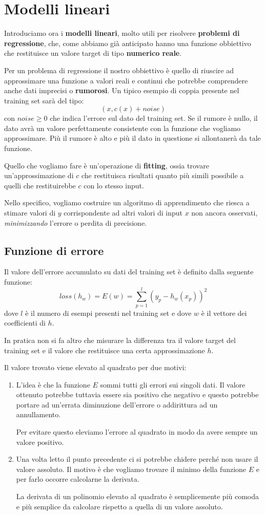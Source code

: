 \chapter{Modelli lineari}
Introduciamo ora i \textbf{modelli lineari}, molto utili per risolvere \textbf{problemi di regressione}, che, come
abbiamo gi\`a anticipato hanno una funzione obbiettivo che restituisce un valore target di tipo \textbf{numerico reale}.

Per un problema di regressione il nostro obbiettivo \`e quello di riuscire ad approssimare una funzione a valori reali
e continui che potrebbe comprendere anche dati imprecisi o \textbf{rumorosi}. Un tipico esempio di coppia presente nel
training set sar\`a del tipo:
\[ (x, c(x) + noise) \]
con $noise \geq 0$ che indica l'errore sul dato del training set. Se il rumore \`e nullo, il dato avr\`a un valore
perfettamente consistente con la funzione che vogliamo approssimare. Pi\`u il rumore \`e alto e pi\`u il dato in questione
si allontaner\`a da tale funzione.

Quello che vogliamo fare \`e un'operazione di \textbf{fitting}, ossia trovare un'approssimazione di $c$ che restituisca
risultati quanto pi\`u simili possibile a quelli che restituirebbe $c$ con lo stesso input.

Nello specifico, vogliamo costruire un algoritmo di apprendimento che riesca a stimare valori di  $y$ corrispondente ad
altri valori di input $x$ non ancora osservati, \emph{minimizzando} l'errore o perdita di precisione.

\section{Funzione di errore}
Il valore dell'errore accumulato su dati del training set \`e definito dalla seguente funzione:
\[ loss(h_w) = E(w) = \sum_{p=1}^l (y_p - h_w(x_p))^2 \]
dove $l$ \`e il numero di esempi presenti nel training set e dove $w$ \`e il vettore dei coefficienti di $h$.

In pratica non si fa altro che misurare la differenza tra il valore target del training set e il valore che restituisce
una certa approssimazione $h$.

Il valore trovato viene elevato al quadrato per due motivi:
\begin{enumerate}
	\item L'idea \`e che la funzione $E$ sommi tutti gli errori sui singoli dati. Il valore ottenuto potrebbe tuttavia
	      essere sia positivo che negativo e questo potrebbe portare ad un'errata diminuzione dell'errore o addirittura
	      ad un annullamento.

	      Per evitare questo eleviamo l'errore al quadrato in modo da avere sempre un valore positivo.
	\item Una volta letto il punto precedente ci si potrebbe chidere perch\'e non usare il valore assoluto. Il motivo \`e
	      che vogliamo trovare il minimo della funzione $E$ e per farlo occorre calcolarne la derivata.

	      La derivata di un  polinomio elevato al quadrato \`e semplicemente pi\`u comoda e pi\`u semplice da calcolare
	      rispetto a quella di un valore assoluto.
\end{enumerate}

